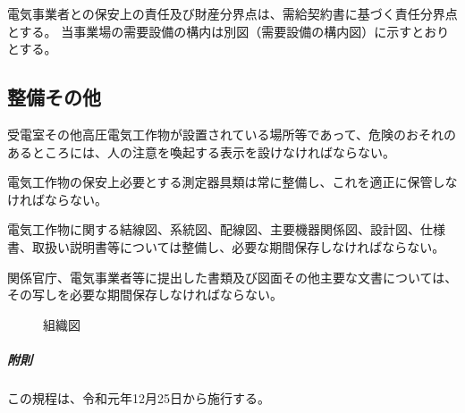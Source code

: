 \documentclass[10pt,a4paper,uplatex]{jsarticle}
\begin{document}
電気事業者との保安上の責任及び財産分界点は、需給契約書に基づく責任分界点  とする。
当事業場の需要設備の構内は別図（需要設備の構内図）に示すとおりとする。

\subsection{整備その他}

受電室その他高圧電気工作物が設置されている場所等であって、危険のおそれのあるところには、人の注意を喚起する表示を設けなければならない。

電気工作物の保安上必要とする測定器具類は常に整備し、これを適正に保管しなければならない。

電気工作物に関する結線図、系統図、配線図、主要機器関係図、設計図、仕様書、取扱い説明書等については整備し、必要な期間保存しなければならない。

関係官庁、電気事業者等に提出した書類及び図面その他主要な文書については、その写しを必要な期間保存しなければならない。


\begin{figure}[h]
\centerline{%
}
\caption{組織図}
\label{fig:soshiki}
\end{figure}

\vspace{1cm}
\subparagraph{附則}
この規程は、令和元年12月25日から施行する。

\end{document}
